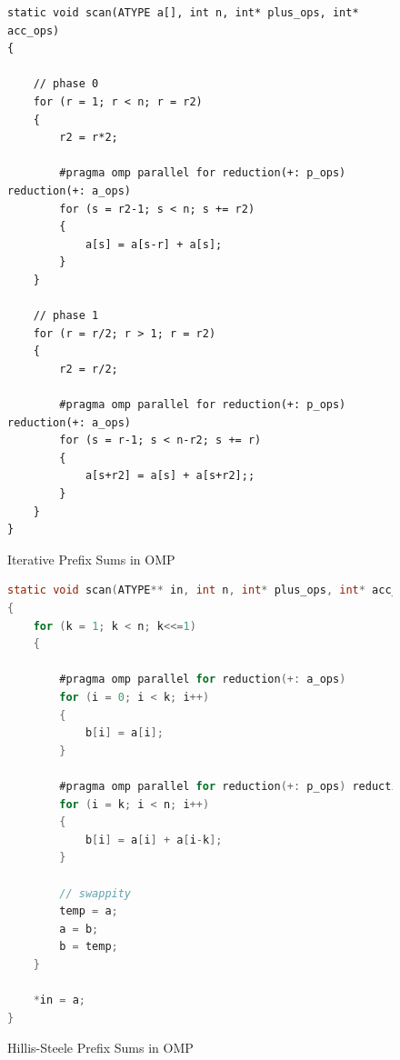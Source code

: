 \documentclass[11pt]{article}
\begin{document}
\begin{figure}[H]
\label{omp_prefix_iterative_code}
\caption{Iterative Prefix Sums in OMP}

\begin{lstlisting}
static void scan(ATYPE a[], int n, int* plus_ops, int* acc_ops)
{

	// phase 0
	for (r = 1; r < n; r = r2)
	{
		r2 = r*2;

		#pragma omp parallel for reduction(+: p_ops) reduction(+: a_ops)
		for (s = r2-1; s < n; s += r2)
		{
			a[s] = a[s-r] + a[s];
		}
	}

	// phase 1
	for (r = r/2; r > 1; r = r2)
	{
		r2 = r/2;

		#pragma omp parallel for reduction(+: p_ops) reduction(+: a_ops)
		for (s = r-1; s < n-r2; s += r)
		{
			a[s+r2] = a[s] + a[s+r2];;
		}
	}
}
\end{lstlisting}
\end{figure}


\begin{figure}[H]
\label{omp_prefix_hillis_steele_code}
\caption{Hillis-Steele Prefix Sums in OMP}

\begin{lstlisting}[language=C]
static void scan(ATYPE** in, int n, int* plus_ops, int* acc_ops)
{
	for (k = 1; k < n; k<<=1) 
	{

		#pragma omp parallel for reduction(+: a_ops)
		for (i = 0; i < k; i++)
		{
			b[i] = a[i];
		}

		#pragma omp parallel for reduction(+: p_ops) reduction(+: a_ops)
		for (i = k; i < n; i++)
		{
			b[i] = a[i] + a[i-k];
		}

		// swappity
		temp = a;
		a = b;
		b = temp;
	}

	*in = a;
}
\end{lstlisting}
\end{figure}
\end{document}
